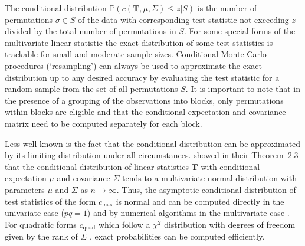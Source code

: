 \documentclass{article}
\newcommand{\Rpackage}[1]{\textit{#1}}
\newcommand{\Prob}{\mathbb{P} }
\newcommand{\T}{\mathbf{T}}
\begin{document}

The conditional distribution $\Prob(c(\T, \mu, \Sigma) \le z | S)$
is the number of permutations $\sigma \in S$ of the data 
with corresponding test statistic not exceeding $z$ divided by the total number
of permutations in $S$. For some special forms of the
multivariate linear statistic the exact distribution of some 
test statistics is trackable for small and moderate sample sizes.
Conditional Monte-Carlo procedures (`resampling') can always be used to 
approximate the exact distribution up to any desired accuracy by evaluating
the test statistic for a random sample from the set of all permutations $S$.
It is important to note that in the presence of a grouping of the observations
into blocks, only permutations within blocks are eligible and that the
conditional expectation and covariance matrix need to be computed
separately for each block.

Less well known is the fact that 
the conditional distribution can be approximated by its limiting distribution
under all circumstances. \cite{StrasserWeber1999} showed in their Theorem~2.3 that the   
conditional distribution of linear statistics $\T$ with conditional    
expectation $\mu$ and covariance $\Sigma$ tends to a multivariate normal
distribution with parameters $\mu$ and $\Sigma$ as $n \rightarrow
\infty$. Thus, the asymptotic conditional distribution of test statistics of
the form $c_\text{max}$ is normal and
can be computed directly in the univariate case ($pq = 1$) and by numerical 
algorithms in the multivariate case \citep[e.g., using the quasi-randomized
Monte-Carlo procedures of][]{numerical-:1992}.
For quadratic forms
$c_\text{quad}$ which follow a $\chi^2$ distribution with degrees of freedom
given by the rank of $\Sigma$ \citep[e.g.~Theorem 6.20, ][]{Rasch1995}, exact
probabilities can be computed efficiently.
\end{document}
